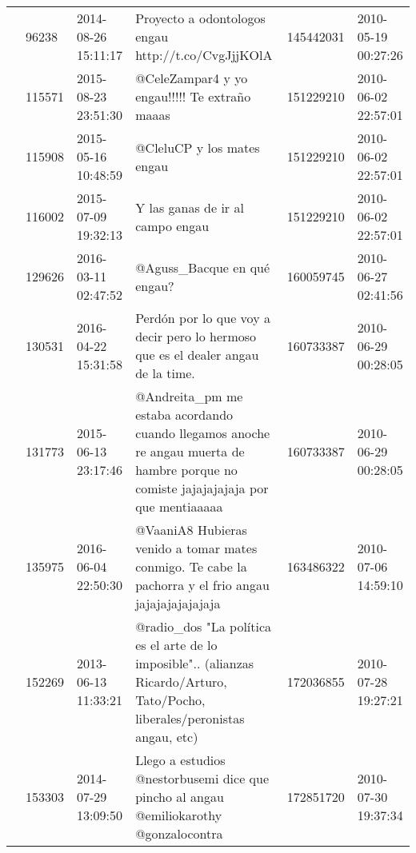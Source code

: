 \begin{tabular}{llllrl}
           & 96238   & 2014-08-26 15:11:17 &                                                                                          Proyecto a odontologos engau http://t.co/CvgJjjKOlA &   145442031 & 2010-05-19 00:27:26 \\
           & 115571  & 2015-08-23 23:51:30 &                                                                                                @CeleZampar4 y yo engau!!!!! Te extraño maaas &   151229210 & 2010-06-02 22:57:01 \\
           & 115908  & 2015-05-16 10:48:59 &                                                                                                                   @CleluCP y los mates engau &   151229210 & 2010-06-02 22:57:01 \\
           & 116002  & 2015-07-09 19:32:13 &                                                                                                             Y las ganas de ir al campo engau &   151229210 & 2010-06-02 22:57:01 \\
           & 129626  & 2016-03-11 02:47:52 &                                                                                                                  @Aguss\_Bacque en qué engau? &   160059745 & 2010-06-27 02:41:56 \\
           & 130531  & 2016-04-22 15:31:58 &                                                             Perdón por lo que voy a decir pero lo hermoso que es el dealer angau de la time. &   160733387 & 2010-06-29 00:28:05 \\
           & 131773  & 2015-06-13 23:17:46 &          @Andreita\_pm me estaba acordando cuando llegamos anoche re angau muerta de hambre porque no comiste jajajajajaja por que mentiaaaaa &   160733387 & 2010-06-29 00:28:05 \\
           & 135975  & 2016-06-04 22:50:30 &                                         @VaaniA8 Hubieras venido a tomar mates conmigo. Te cabe la pachorra y el frio angau jajajajajajajaja &   163486322 & 2010-07-06 14:59:10 \\
           & 152269  & 2013-06-13 11:33:21 &                 @radio\_dos "La política es el arte de lo imposible".. (alianzas Ricardo/Arturo, Tato/Pocho, liberales/peronistas angau, etc) &   172036855 & 2010-07-28 19:27:21 \\
           & 153303  & 2014-07-29 13:09:50 &                                                        Llego a estudios @nestorbusemi dice que pincho al angau @emiliokarothy @gonzalocontra &   172851720 & 2010-07-30 19:37:34 \\

\end{tabular}
